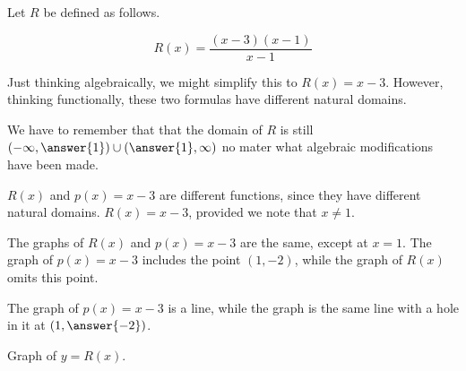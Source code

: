 \documentclass{ximera}
\begin{document}
\begin{example}

Let $R$ be defined as follows.


\[   R(x) = \frac{(x-3)(x-1)}{x-1}            \]


Just thinking algebraically, we might simplify this to $R(x) = x-3$. However, thinking functionally, these two formulas have different natural domains.


We have to remember that that the domain of $R$ is still $\left( -\infty, \answer{1} \right) \cup \left( \answer{1},\infty \right)$ no mater what algebraic modifications have been made.

$R(x)$ and $p(x) = x-3$ are different functions, since they have different natural domains. $R(x) = x - 3$, provided we note that $x \ne 1$.


The graphs of $R(x)$ and $p(x) = x-3$ are the same, except at $x=1$.  The graph of $p(x) = x-3$ includes the point $(1, -2)$, while the graph of $R(x)$ omits this point.



The graph of $p(x) = x-3$ is a line, while the graph is the same line with a hole in it at $\left( 1, \answer{-2} \right)$.












Graph of $y = R(x)$.


\begin{image}
\end{image}
\end{example}
\end{document}
